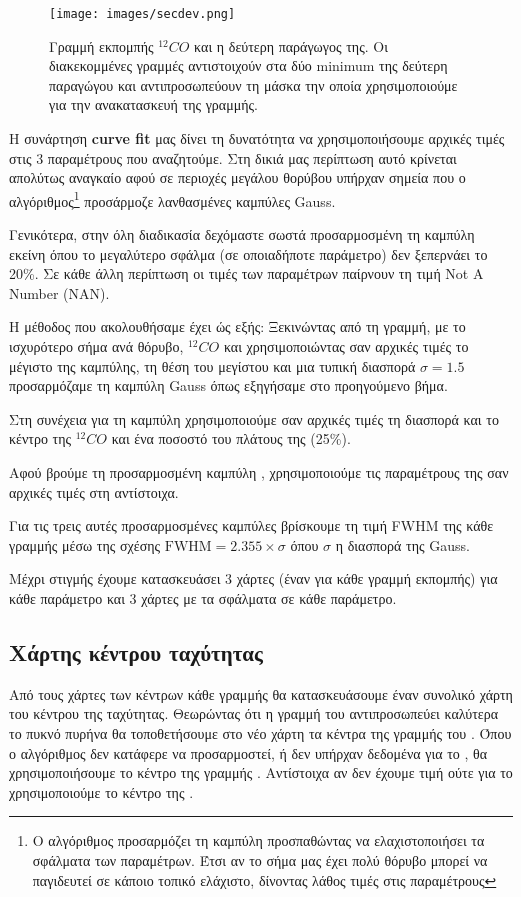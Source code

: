 \documentclass[a4paper,12pt]{memoir}
\begin{document}
\begin{figure}[h]
	\label{fig:secdev}
	\centering
	\texttt{[image: images/secdev.png]}
	\caption{Γραμμή εκπομπής $^{12}CO$ και η δεύτερη παράγωγος της. Οι διακεκομμένες γραμμές αντιστοιχούν στα δύο minimum της δεύτερη παραγώγου και αντιπροσωπεύουν τη μάσκα την οποία χρησιμοποιούμε για την ανακατασκευή της γραμμής.}
\end{figure}


Η συνάρτηση \textbf{curve fit} μας δίνει τη δυνατότητα να χρησιμοποιήσουμε αρχικές τιμές στις 3 παραμέτρους που αναζητούμε. Στη δικιά μας περίπτωση αυτό κρίνεται απολύτως αναγκαίο αφού σε περιοχές μεγάλου θορύβου υπήρχαν σημεία που ο αλγόριθμος\footnote{Ο αλγόριθμος προσαρμόζει τη καμπύλη προσπαθώντας να ελαχιστοποιήσει τα σφάλματα των παραμέτρων. Έτσι αν το σήμα μας έχει πολύ θόρυβο μπορεί να παγιδευτεί σε κάποιο τοπικό ελάχιστο, δίνοντας λάθος τιμές στις παραμέτρους} προσάρμοζε λανθασμένες καμπύλες Gauss. 

Γενικότερα, στην όλη διαδικασία δεχόμαστε σωστά προσαρμοσμένη τη καμπύλη εκείνη όπου το μεγαλύτερο σφάλμα (σε οποιαδήποτε παράμετρο) δεν ξεπερνάει το 20\%. Σε κάθε άλλη περίπτωση οι τιμές των παραμέτρων παίρνουν τη τιμή Not A Number (NAN).

Η μέθοδος που ακολουθήσαμε έχει ώς εξής: Ξεκινώντας από τη γραμμή, με το ισχυρότερο σήμα ανά θόρυβο, $^{12}CO$ και χρησιμοποιώντας σαν αρχικές τιμές το μέγιστο της καμπύλης, τη θέση του μεγίστου και μια τυπική διασπορά $\sigma =1.5$ προσαρμόζαμε τη καμπύλη Gauss όπως εξηγήσαμε στο προηγούμενο βήμα. 

Στη συνέχεια για τη καμπύλη  χρησιμοποιούμε σαν αρχικές τιμές τη διασπορά και το κέντρο της $^{12}CO$ και ένα ποσοστό του πλάτους της (25\%).

Αφού βρούμε τη προσαρμοσμένη καμπύλη , χρησιμοποιούμε τις παραμέτρους της σαν αρχικές τιμές στη  αντίστοιχα.

Για τις τρεις αυτές προσαρμοσμένες καμπύλες βρίσκουμε τη τιμή FWHM της κάθε γραμμής μέσω της σχέσης $\text{FWHM}=2.355 \times \sigma$ όπου $\sigma$ η διασπορά της Gauss.

Μέχρι στιγμής έχουμε κατασκευάσει 3 χάρτες (έναν για κάθε γραμμή εκπομπής) για κάθε παράμετρο και 3 χάρτες με τα σφάλματα σε κάθε παράμετρο.


\subsection{Χάρτης κέντρου ταχύτητας}
Από τους χάρτες των κέντρων κάθε γραμμής θα κατασκευάσουμε έναν συνολικό χάρτη του κέντρου της ταχύτητας. Θεωρώντας ότι η γραμμή του  αντιπροσωπεύει καλύτερα το πυκνό πυρήνα θα τοποθετήσουμε στο νέο χάρτη τα κέντρα της γραμμής του . Όπου ο αλγόριθμος δεν κατάφερε να προσαρμοστεί, ή δεν υπήρχαν δεδομένα για το , θα χρησιμοποιήσουμε το κέντρο της γραμμής . Αντίστοιχα αν δεν έχουμε τιμή ούτε για το  χρησιμοποιούμε το κέντρο της .
\end{document}
